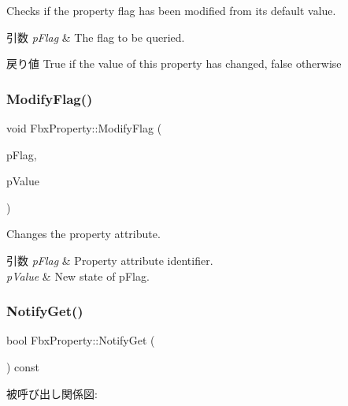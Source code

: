 Checks if the property flag has been modified from its default value. 
\begin{DoxyParams}{引数}
{\em p\+Flag} & The flag to be queried. \\
\hline
\end{DoxyParams}
\begin{DoxyReturn}{戻り値}
{\ttfamily True} if the value of this property has changed, {\ttfamily false} otherwise 
\end{DoxyReturn}
\mbox{\label{class_fbx_property_a16da0381546978afc477b033239f1fc9}} 
\subsubsection{\texorpdfstring{Modify\+Flag()}{ModifyFlag()}}
{\footnotesize\ttfamily void Fbx\+Property\+::\+Modify\+Flag (\begin{DoxyParamCaption}\item[{\hyperlink{class_fbx_property_flags_afabfa7e0949aac8a7dcdf8a141867e99}{Fbx\+Property\+Flags\+::\+E\+Flags}}]{p\+Flag,  }\item[{bool}]{p\+Value }\end{DoxyParamCaption})}

Changes the property attribute. 
\begin{DoxyParams}{引数}
{\em p\+Flag} & Property attribute identifier. \\
\hline
{\em p\+Value} & New state of p\+Flag. \\
\hline
\end{DoxyParams}
\mbox{\label{class_fbx_property_abbb2f1f50f22fbcd94ad56e3373efaac}} 
\subsubsection{\texorpdfstring{Notify\+Get()}{NotifyGet()}}
{\footnotesize\ttfamily bool Fbx\+Property\+::\+Notify\+Get (\begin{DoxyParamCaption}{ }\end{DoxyParamCaption}) const\hspace{0.3cm}{\ttfamily [protected]}}

被呼び出し関係図\+:
\mbox{\label{class_fbx_property_ac2a6a7d8711567294c90f37791846331}} 
